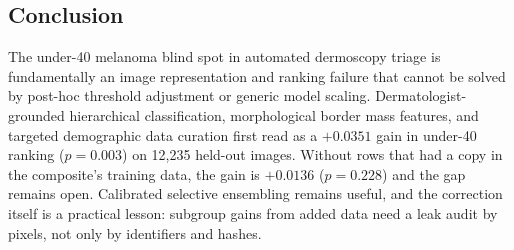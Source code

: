 \documentclass[journal]{IEEEtran}
\begin{document}
\subsection{Conclusion}
The under-40 melanoma blind spot in automated dermoscopy triage is fundamentally an image representation and ranking failure that cannot be solved by post-hoc threshold adjustment or generic model scaling. Dermatologist-grounded hierarchical classification, morphological border mass features, and targeted demographic data curation first read as a $+0.0351$ gain in under-40 ranking ($p = 0.003$) on 12,235 held-out images. Without rows that had a copy in the composite's training data, the gain is $+0.0136$ ($p = 0.228$) and the gap remains open. Calibrated selective ensembling remains useful, and the correction itself is a practical lesson: subgroup gains from added data need a leak audit by pixels, not only by identifiers and hashes.
\end{document}
